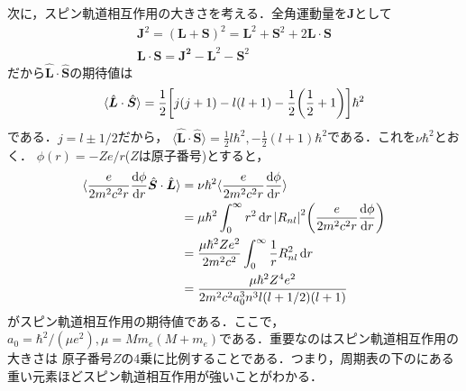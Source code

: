 \documentclass{report}
\begin{document}
  次に，スピン軌道相互作用の大きさを考える．全角運動量を$\bm{J}$として
  \begin{align}
    \bm{J}^2 = (\bm{L} + \bm{S})^2 = \bm{L}^2 + \bm{S}^2 + 2\bm{L}\cdot \bm{S}\\
    \bm{L}\cdot\bm{S} = \bm{J^2} - \bm{L}^2 - \bm{S}^2
  \end{align}
  だから$\hat{\bm{L}}\cdot\hat{\bm{S}}$の期待値は
  \begin{align}
    \langle\hat{\bm{L}}\cdot\hat{\bm{S}} \rangle = \frac{1}{2}\qty[j(j+1) - l(l+1) - \frac{1}{2}\qty(\frac{1}{2}+1)]\hbar^2
  \end{align}
  である．$j = l \pm 1/2$だから，
  $\langle\hat{\bm{L}}\cdot\hat{\bm{S}} \rangle = \frac{1}{2}l\hbar^2,-\frac{1}{2}(l+1)\hbar^2$である．これを$\nu\hbar^2$とおく．
  $\phi(r) = -Ze/r$($Z$は原子番号)とすると，
  \begin{align}
    \langle \frac{e}{2m^2c^2r}\dv{\phi}{r}\hat{\bm{S}}\cdot\hat{\bm{L}} \rangle &= \nu\hbar^2 \langle \frac{e}{2m^2c^2r}\dv{\phi}{r} \rangle\\
    &= \mu\hbar^2 \int_{0}^{\infty} r^2 \dd{r} \abs{R_{nl}}^2 \qty(\frac{e}{2m^2c^2r}\dv{\phi}{r})\\
    &= \frac{\mu\hbar^2 Z e^2}{2m^2c^2}\int_{0}^{\infty} \frac{1}{r}R_{nl}^2 \dd{r}\\
    &= \frac{\mu\hbar^2 Z^4 e^2}{2m^2 c^2 a_0^3n^3l(l+1/2)(l+1)}
  \end{align}
  がスピン軌道相互作用の期待値である．ここで，$a_0=\hbar^2/(\mu e^2),\mu = Mm_e(M+m_e)$である．重要なのはスピン軌道相互作用の大きさは
  原子番号$Z$の4乗に比例することである．つまり，周期表の下のにある重い元素ほどスピン軌道相互作用が強いことがわかる．
\end{document}
